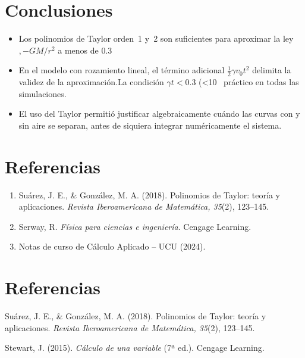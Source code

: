 \documentclass{article}
\begin{document}
\section{Conclusiones}\label{sec:conclusiones}
\begin{itemize}
\item Los polinomios de Taylor orden 1 y 2 son suficientes para aproximar
la ley $,-GM/r^2$ a menos de 0.3 %
\item En el modelo con rozamiento lineal, el término adicional
$\tfrac12\gamma v_0 t^2$ delimita la validez de la aproximación.La condición $\gamma t<0.3$ (<10 %
práctico en todas las simulaciones.
\item El uso del Taylor permitió justificar algebraicamente cuándo las
curvas con y sin aire se separan, antes de siquiera integrar
numéricamente el sistema.
\end{itemize}

\section{Referencias}
\begin{enumerate}
\item Suárez, J. E., \& González, M. A. (2018). Polinomios de Taylor: teoría y aplicaciones. \textit{Revista Iberoamericana de Matemática, 35}(2), 123–145.
\item Serway, R.
\emph{Física para ciencias e ingeniería}. Cengage Learning.
\item Notas de curso de Cálculo Aplicado – UCU (2024).
\end{enumerate}
\section{Referencias}
Suárez, J. E., \& González, M. A. (2018). Polinomios de Taylor: teoría y aplicaciones. \textit{Revista Iberoamericana de Matemática, 35}(2), 123–145.

Stewart, J. (2015). \textit{Cálculo de una variable} (7ª ed.). Cengage Learning.
\end{document}

